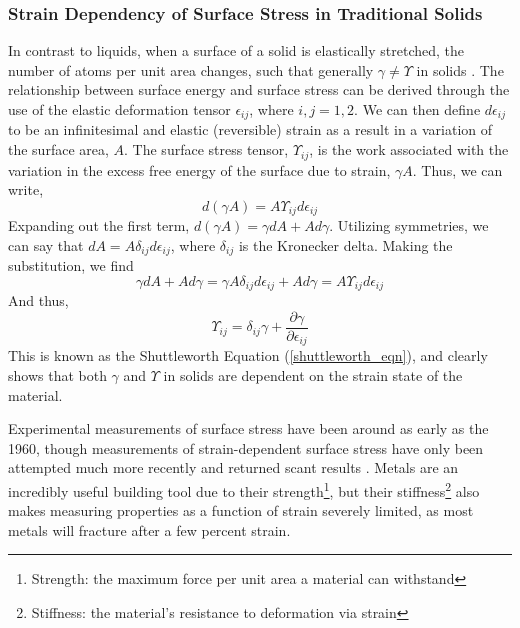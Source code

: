 \subsubsection{Strain Dependency of Surface Stress in Traditional Solids}
In contrast to liquids, when a surface of a solid is elastically stretched, the number of atoms per unit area changes, such that generally $ \gamma \neq \Upsilon$ in solids \cite{cammarata1994surface}. The relationship between surface energy and surface stress can be derived through the use of the elastic deformation tensor $\epsilon_{ij}$, where $i,j=1,2$. We can then define $d\epsilon_{ij}$ to be an infinitesimal and elastic (reversible) strain as a result in a variation of the surface area, $A$. The surface stress tensor, $\Upsilon_{ij}$, is the work associated with the variation in the excess free energy of the surface due to strain, $\gamma A$. Thus, we can write, \[d(\gamma A) = A \Upsilon_{ij} d\epsilon_{ij}\] Expanding out the first term, $d(\gamma A) = \gamma dA + A d\gamma$. Utilizing symmetries, we can say that $dA = A \delta_{ij} d\epsilon_{ij}$, where $\delta_{ij}$ is the Kronecker delta. Making the substitution, we find \[\gamma dA + A d\gamma = \gamma A \delta_{ij} d\epsilon_{ij} + A d\gamma = A \Upsilon_{ij} d\epsilon_{ij}\] And thus,
\begin{equation}
\label{shuttleworth_eqn}
\Upsilon_{ij} = \delta_{ij}\gamma + \frac{\partial \gamma}{\partial \epsilon_{ij}} 
\end{equation}
This is known as the Shuttleworth Equation (\ref{shuttleworth_eqn}), and clearly shows that both $\gamma$ and $\Upsilon$ in solids are dependent on the strain state of the material.

Experimental measurements of surface stress have been around as early as the 1960, though measurements of strain-dependent surface stress have only been attempted much more recently and returned scant results \cite{mays1968surface,wasserman1970determination,hanneman1962elastic,martinez1990direct,schell1990mechanical}. Metals are an incredibly useful building tool due to their strength\footnote{Strength: the maximum force per unit area a material can withstand}, but their stiffness\footnote{Stiffness: the material's resistance to deformation via strain} also makes measuring properties as a function of strain severely limited, as most metals will fracture after a few percent strain.



